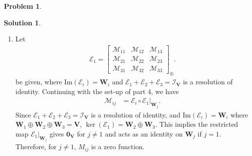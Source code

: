 \documentclass{book}
\theoremstyle{definition}
\newtheorem*{prob*}{Problem}
\newtheorem*{sln*}{Solution}
\newcommand{\V}{\mathbf{V}}
\newcommand{\W}{\mathbf{W}}
\newcommand{\M}{\mathcal{M}}
\newcommand{\E}{\mathcal{E}}
\newcommand{\ima}{\text{Im}}
\begin{document}
\begin{prob*}
\begin{sln*}
\begin{enumerate}
			
			
			
			
			
			
			
			
			
			
			
			
			
			
			\newpage
			
			
			
			
			
			
			
			\item Let
			\begin{align*}
			\mathcal{E}_1 = \begin{bmatrix}
			\M_{11} & \M_{12} & \M_{13}\\
			\M_{21} & \M_{22} & \M_{23}\\
			\M_{31} & \M_{32} & \M_{33}
			\end{bmatrix}_\oplus.
			\end{align*}
			be given, where $\ima(\E_i) = \W_i$ and $\E_1 + \E_2 + \E_3 = \mathcal{I}_\V$ is a resolution of identity. Continuing with the set-up of part 4, we have
			\begin{align*}
			\M_{ij} &= \E_i \circ \E_1\bigg\vert_{\W_j}.
			\end{align*}
			Since $\E_1 + \E_2 + \E_3 = \mathcal{I}_\V$ is a resolution of identity, and $\ima(\E_i) = \W_i$ where $\W_1\oplus\W_2\oplus\W_3 = \V$, $\ker(\E_1) = \W_2 \oplus \W_3$. This implies the restricted map $\E_1\bigg\vert_{\W_j}$ gives $\mathbf{0}_\V$ for $j\neq 1$ and acts as an identity on $\W_j$ if $j = 1$. Therefore, for $j \neq 1$, $M_{ij}$ is a zero function.\\
			

\end{enumerate}
\end{sln*}
\end{prob*}
\end{document}
